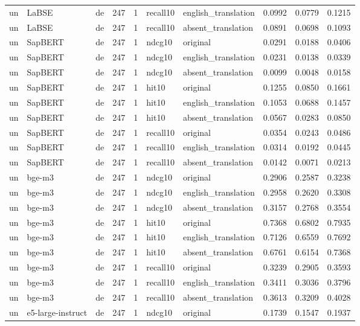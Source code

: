 \begin{tabular}{lllrrllrrr}
un & LaBSE & de & 247 & 1 & recall10 & english\_translation & 0.0992 & 0.0779 & 0.1215 \\
un & LaBSE & de & 247 & 1 & recall10 & absent\_translation & 0.0891 & 0.0698 & 0.1093 \\
un & SapBERT & de & 247 & 1 & ndcg10 & original & 0.0291 & 0.0188 & 0.0406 \\
un & SapBERT & de & 247 & 1 & ndcg10 & english\_translation & 0.0231 & 0.0138 & 0.0339 \\
un & SapBERT & de & 247 & 1 & ndcg10 & absent\_translation & 0.0099 & 0.0048 & 0.0158 \\
un & SapBERT & de & 247 & 1 & hit10 & original & 0.1255 & 0.0850 & 0.1661 \\
un & SapBERT & de & 247 & 1 & hit10 & english\_translation & 0.1053 & 0.0688 & 0.1457 \\
un & SapBERT & de & 247 & 1 & hit10 & absent\_translation & 0.0567 & 0.0283 & 0.0850 \\
un & SapBERT & de & 247 & 1 & recall10 & original & 0.0354 & 0.0243 & 0.0486 \\
un & SapBERT & de & 247 & 1 & recall10 & english\_translation & 0.0314 & 0.0192 & 0.0445 \\
un & SapBERT & de & 247 & 1 & recall10 & absent\_translation & 0.0142 & 0.0071 & 0.0213 \\
un & bge-m3 & de & 247 & 1 & ndcg10 & original & 0.2906 & 0.2587 & 0.3238 \\
un & bge-m3 & de & 247 & 1 & ndcg10 & english\_translation & 0.2958 & 0.2620 & 0.3308 \\
un & bge-m3 & de & 247 & 1 & ndcg10 & absent\_translation & 0.3157 & 0.2768 & 0.3554 \\
un & bge-m3 & de & 247 & 1 & hit10 & original & 0.7368 & 0.6802 & 0.7935 \\
un & bge-m3 & de & 247 & 1 & hit10 & english\_translation & 0.7126 & 0.6559 & 0.7692 \\
un & bge-m3 & de & 247 & 1 & hit10 & absent\_translation & 0.6761 & 0.6154 & 0.7368 \\
un & bge-m3 & de & 247 & 1 & recall10 & original & 0.3239 & 0.2905 & 0.3593 \\
un & bge-m3 & de & 247 & 1 & recall10 & english\_translation & 0.3411 & 0.3036 & 0.3796 \\
un & bge-m3 & de & 247 & 1 & recall10 & absent\_translation & 0.3613 & 0.3209 & 0.4028 \\
un & e5-large-instruct & de & 247 & 1 & ndcg10 & original & 0.1739 & 0.1547 & 0.1937 \\

\end{tabular}
